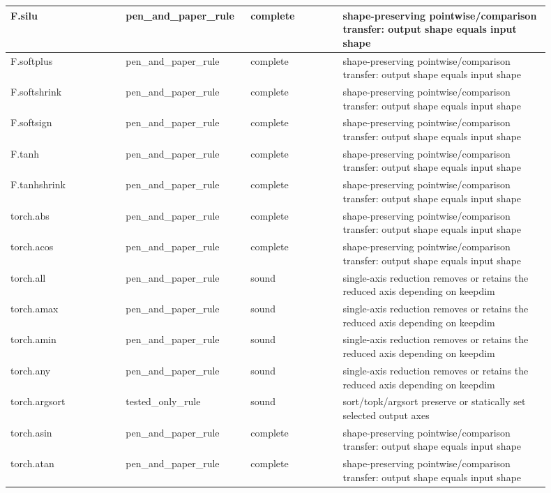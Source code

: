 \documentclass[10pt]{article}
\begin{document}
\begin{longtable}{|p{0.20\linewidth}|p{0.18\linewidth}|p{0.16\linewidth}|p{0.36\linewidth}|}
\hline
F.silu & pen\_and\_paper\_rule & complete & shape-preserving pointwise/comparison transfer: output shape equals input shape \\
\hline
F.softplus & pen\_and\_paper\_rule & complete & shape-preserving pointwise/comparison transfer: output shape equals input shape \\
\hline
F.softshrink & pen\_and\_paper\_rule & complete & shape-preserving pointwise/comparison transfer: output shape equals input shape \\
\hline
F.softsign & pen\_and\_paper\_rule & complete & shape-preserving pointwise/comparison transfer: output shape equals input shape \\
\hline
F.tanh & pen\_and\_paper\_rule & complete & shape-preserving pointwise/comparison transfer: output shape equals input shape \\
\hline
F.tanhshrink & pen\_and\_paper\_rule & complete & shape-preserving pointwise/comparison transfer: output shape equals input shape \\
\hline
torch.abs & pen\_and\_paper\_rule & complete & shape-preserving pointwise/comparison transfer: output shape equals input shape \\
\hline
torch.acos & pen\_and\_paper\_rule & complete & shape-preserving pointwise/comparison transfer: output shape equals input shape \\
\hline
torch.all & pen\_and\_paper\_rule & sound & single-axis reduction removes or retains the reduced axis depending on keepdim \\
\hline
torch.amax & pen\_and\_paper\_rule & sound & single-axis reduction removes or retains the reduced axis depending on keepdim \\
\hline
torch.amin & pen\_and\_paper\_rule & sound & single-axis reduction removes or retains the reduced axis depending on keepdim \\
\hline
torch.any & pen\_and\_paper\_rule & sound & single-axis reduction removes or retains the reduced axis depending on keepdim \\
\hline
torch.argsort & tested\_only\_rule & sound & sort/topk/argsort preserve or statically set selected output axes \\
\hline
torch.asin & pen\_and\_paper\_rule & complete & shape-preserving pointwise/comparison transfer: output shape equals input shape \\
\hline
torch.atan & pen\_and\_paper\_rule & complete & shape-preserving pointwise/comparison transfer: output shape equals input shape \\

\end{longtable}
\end{document}
